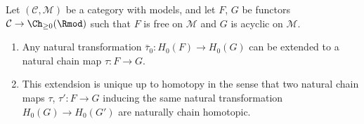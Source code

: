 \documentclass[main.tex]{subfiles}
\begin{document}
\begin{theorem}
  \label{thm:acyclic_model_theorem}
  Let $(\mathcal{C}, \mathcal{M})$ be a category with models, and let $F$, $G$ be functors $\mathcal{C} \to \Ch_{\geq 0}(\Rmod)$ such that $F$ is free on $\mathcal{M}$ and $G$ is acyclic on $\mathcal{M}$.
  \begin{enumerate}
    \item Any natural transformation $\bar{\tau}_{0}\colon H_{0}(F) \to H_{0}(G)$ can be extended to a natural chain map $\tau\colon F \to G$.

    \item This extendsion is unique up to homotopy in the sense that two natural chain maps $\tau$, $\tau'\colon F \to G$ inducing the same natural transformation $H_{0}(G) \to H_{0}(G')$ are naturally chain homotopic.
  \end{enumerate}
\end{theorem}
\end{document}
